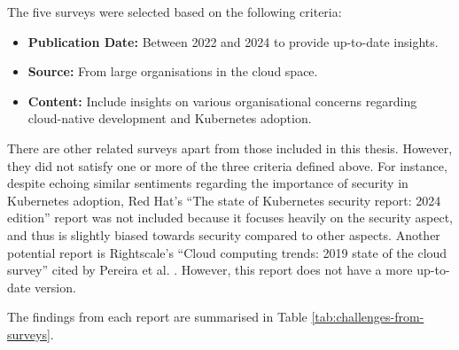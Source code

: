 The five surveys were selected based on the following criteria:

\begin{itemize}
\tightlist
\item
  \textbf{Publication Date:} Between 2022 and 2024 to provide up-to-date insights.
\item
  \textbf{Source:} From large organisations in the cloud space.
\item
  \textbf{Content:} Include insights on various organisational concerns regarding cloud-native development and Kubernetes adoption.
\end{itemize}




There are other related surveys apart from those included in this thesis. However, they did not satisfy one or more of the three criteria defined above. For instance, despite echoing similar sentiments regarding the importance of security in Kubernetes adoption, Red Hat's ``The state of Kubernetes security report: 2024 edition'' report \cite{redhatinc.StateKubernetesSecurity2024} was not included because it focuses heavily on the security aspect, and thus is slightly biased towards security compared to other aspects. Another potential report is Rightscale's ``Cloud computing trends: 2019 state of the cloud survey'' cited by Pereira et al. \cite{pereiraferreiraPerformanceEvaluationContainers2019}. However, this report does not have a more up-to-date version.

The findings from each report are summarised in Table \ref{tab:challenges-from-surveys}.

